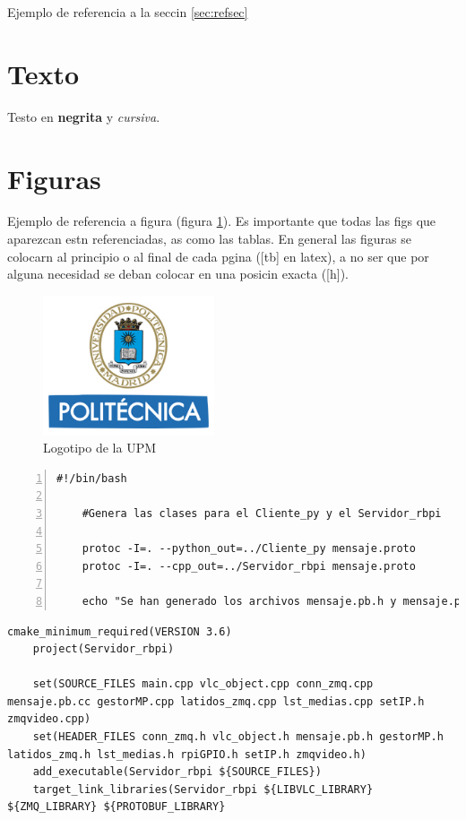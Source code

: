 Ejemplo de referencia a la seccin \ref{sec:refsec}

\section{Texto}

Testo en \textbf{negrita} y \textit{cursiva}.

\section{Figuras}

Ejemplo de referencia a figura (figura \ref{fig:logo_upm}). Es importante que todas las figs que aparezcan estn referenciadas, as como las tablas. En general las figuras se colocarn al principio o al final de cada pgina ([tb] en latex), a no ser que por alguna necesidad se deban colocar en una posicin exacta ([h]).

\begin{figure}[tb]
\centering
\includegraphics[width=0.45\textwidth]{figs/Logo_UPM.jpg}
\caption{Logotipo de la UPM}
\label{fig:logo_upm}
\end{figure}

\begin{lstlisting}[style=consola, numbers=left]
    #!/bin/bash

    #Genera las clases para el Cliente_py y el Servidor_rbpi

    protoc -I=. --python_out=../Cliente_py mensaje.proto
    protoc -I=. --cpp_out=../Servidor_rbpi mensaje.proto

    echo "Se han generado los archivos mensaje.pb.h y mensaje.pb.cc"
\end{lstlisting}

\begin{lstlisting}[style=C, numbers=none]
    cmake_minimum_required(VERSION 3.6)
    project(Servidor_rbpi)

    set(SOURCE_FILES main.cpp vlc_object.cpp conn_zmq.cpp mensaje.pb.cc gestorMP.cpp latidos_zmq.cpp lst_medias.cpp setIP.h zmqvideo.cpp)
    set(HEADER_FILES conn_zmq.h vlc_object.h mensaje.pb.h gestorMP.h latidos_zmq.h lst_medias.h rpiGPIO.h setIP.h zmqvideo.h)
    add_executable(Servidor_rbpi ${SOURCE_FILES})
    target_link_libraries(Servidor_rbpi ${LIBVLC_LIBRARY} ${ZMQ_LIBRARY} ${PROTOBUF_LIBRARY}
\end{lstlisting}